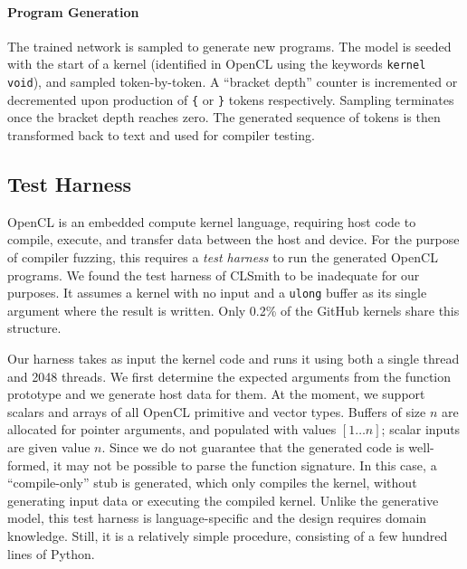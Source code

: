 \paragraph{Program Generation} The trained network is sampled to generate new programs. The model is seeded with the start of a kernel (identified in OpenCL using the keywords \texttt{kernel void}), and sampled token-by-token. A ``bracket depth'' counter is incremented or decremented upon production of \texttt{\{} or \texttt{\}} tokens respectively. Sampling terminates once the bracket depth reaches zero. The generated sequence of tokens is then transformed back to text and used for compiler testing.


\subsection{Test Harness}


OpenCL is an embedded compute kernel language, requiring host code to compile, execute, and transfer data between the host and device. For the purpose of compiler fuzzing, this requires a \emph{test harness} to run the generated OpenCL programs. We found the test harness of CLSmith to be inadequate for our purposes. It assumes a kernel with no input and a \texttt{ulong} buffer as its single argument where the result is written. Only 0.2\% of the GitHub kernels share this structure. 


Our harness takes as input the kernel code and runs it using both a single thread and 2048 threads. We first determine the expected arguments from the function prototype and we generate host data for them. At the moment, we support scalars and arrays of all OpenCL primitive and vector types. Buffers of size $n$ are allocated for pointer arguments, and populated with values {$[1 \ldots n]$}; scalar inputs are given value $n$. Since we do not guarantee that the generated code is well-formed, it may not be possible to parse the function signature. In this case, a ``compile-only'' stub is generated, which only compiles the kernel, without generating input data or executing the compiled kernel. Unlike the generative model, this test harness is language-specific and the design requires domain knowledge. Still, it is a relatively simple procedure, consisting of a few hundred lines of Python.

